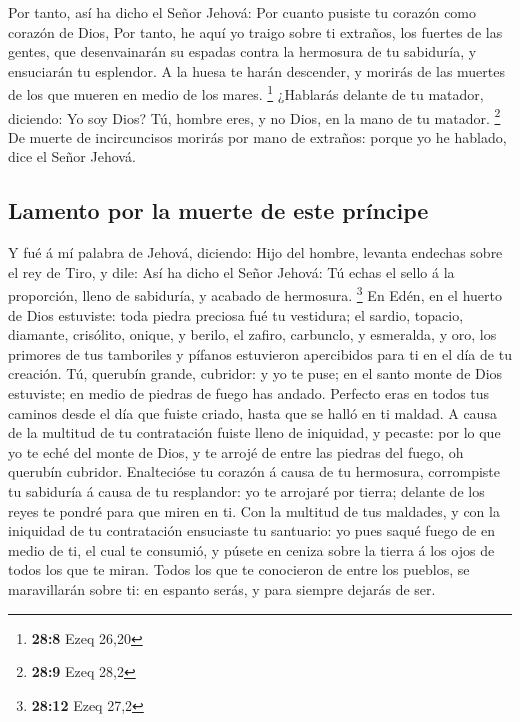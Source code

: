  Por tanto, así ha dicho el Señor Jehová: Por cuanto pusiste
tu corazón como corazón de Dios,  Por tanto, he aquí yo
traigo sobre ti extraños, los fuertes de las gentes, que desenvainarán
su espadas contra la hermosura de tu sabiduría, y ensuciarán tu
esplendor.  A la huesa te harán descender, y morirás de las
muertes de los que mueren en medio de los mares. \footnote{\textbf{28:8}
  Ezeq 26,20}  ¿Hablarás delante de tu matador, diciendo: Yo
soy Dios? Tú, hombre eres, y no Dios, en la mano de tu matador.
\footnote{\textbf{28:9} Ezeq 28,2}  De muerte de
incircuncisos morirás por mano de extraños: porque yo he hablado, dice
el Señor Jehová.

\hypertarget{lamento-por-la-muerte-de-este-pruxedncipe}{%
\subsection{Lamento por la muerte de este
príncipe}\label{lamento-por-la-muerte-de-este-pruxedncipe}}

 Y fué á mí palabra de Jehová, diciendo:  Hijo
del hombre, levanta endechas sobre el rey de Tiro, y dile: Así ha dicho
el Señor Jehová: Tú echas el sello á la proporción, lleno de sabiduría,
y acabado de hermosura. \footnote{\textbf{28:12} Ezeq 27,2}
 En Edén, en el huerto de Dios estuviste: toda piedra
preciosa fué tu vestidura; el sardio, topacio, diamante, crisólito,
onique, y berilo, el zafiro, carbunclo, y esmeralda, y oro, los primores
de tus tamboriles y pífanos estuvieron apercibidos para ti en el día de
tu creación.  Tú, querubín grande, cubridor: y yo te puse;
en el santo monte de Dios estuviste; en medio de piedras de fuego has
andado.  Perfecto eras en todos tus caminos desde el día
que fuiste criado, hasta que se halló en ti maldad.  A
causa de la multitud de tu contratación fuiste lleno de iniquidad, y
pecaste: por lo que yo te eché del monte de Dios, y te arrojé de entre
las piedras del fuego, oh querubín cubridor.  Enaltecióse
tu corazón á causa de tu hermosura, corrompiste tu sabiduría á causa de
tu resplandor: yo te arrojaré por tierra; delante de los reyes te pondré
para que miren en ti.  Con la multitud de tus maldades, y
con la iniquidad de tu contratación ensuciaste tu santuario: yo pues
saqué fuego de en medio de ti, el cual te consumió, y púsete en ceniza
sobre la tierra á los ojos de todos los que te miran. 
Todos los que te conocieron de entre los pueblos, se maravillarán sobre
ti: en espanto serás, y para siempre dejarás de ser.

